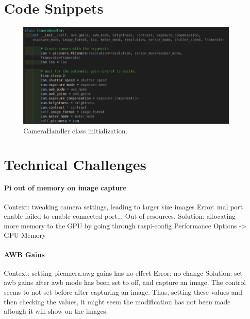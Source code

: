 \appendix
\section{Code Snippets}
\label{app:code_snippets}
\begin{figure}[H]
	\centering
	\includegraphics[width=\textwidth]{Images/Code Screenshots/camerahandler.png}
	\caption{CameraHandler class initialization.}
	\label{fig:code_camerahandler}
\end{figure}

\section{Technical Challenges}
\paragraph{Pi out of memory on image capture}
Context: tweaking camera settings, leading to larger size images
Error: mal port enable failed to enable connected port... Out of resources.
Solution: allocating more memory to the GPU by going through raspi-config Performance Options -> GPU Memory

\paragraph{AWB Gains}
Context: setting picamera.awg gains has no effect
Error: no change
Solution: set awb gains after awb mode has been set to off, and capture an image. The control seems to not set before after capturing an image. Thus, setting these values and then checking the values, it might seem the modification has not been made altough it will show on the images.

